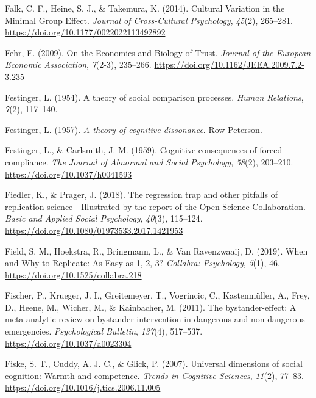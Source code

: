 \documentclass[
  letterpaper,
]{book}
\newlength{\cslhangindent}
\newenvironment{CSLReferences}[2] %
 {\begin{list}{}{%
  \setlength{\itemindent}{0pt}
  \setlength{\leftmargin}{0pt}
  \setlength{\parsep}{0pt}
  \ifodd #1
   \setlength{\leftmargin}{\cslhangindent}
   \setlength{\itemindent}{-1\cslhangindent}
  \fi
  \setlength{\itemsep}{#2\baselineskip}}}
 {\end{list}}
\begin{document}
\begin{CSLReferences}{1}{0}
Falk, C. F., Heine, S. J., \& Takemura, K. (2014). Cultural {Variation}
in the {Minimal} {Group} {Effect}. \emph{Journal of Cross-Cultural
Psychology}, \emph{45}(2), 265--281.
\url{https://doi.org/10.1177/0022022113492892}

Fehr, E. (2009). On the {Economics} and {Biology} of {Trust}.
\emph{Journal of the European Economic Association}, \emph{7}(2-3),
235--266. \url{https://doi.org/10.1162/JEEA.2009.7.2-3.235}

Festinger, L. (1954). A theory of social comparison processes.
\emph{Human Relations}, \emph{7}(2), 117--140.

Festinger, L. (1957). \emph{A theory of cognitive dissonance}. Row
Peterson.

Festinger, L., \& Carlsmith, J. M. (1959). Cognitive consequences of
forced compliance. \emph{The Journal of Abnormal and Social Psychology},
\emph{58}(2), 203--210. \url{https://doi.org/10.1037/h0041593}

Fiedler, K., \& Prager, J. (2018). The regression trap and other
pitfalls of replication science---{Illustrated} by the report of the
{Open} {Science} {Collaboration}. \emph{Basic and Applied Social
Psychology}, \emph{40}(3), 115--124.
\url{https://doi.org/10.1080/01973533.2017.1421953}

Field, S. M., Hoekstra, R., Bringmann, L., \& Van Ravenzwaaij, D.
(2019). When and {Why} to {Replicate}: {As} {Easy} as 1, 2, 3?
\emph{Collabra: Psychology}, \emph{5}(1), 46.
\url{https://doi.org/10.1525/collabra.218}

Fischer, P., Krueger, J. I., Greitemeyer, T., Vogrincic, C.,
Kastenmüller, A., Frey, D., Heene, M., Wicher, M., \& Kainbacher, M.
(2011). The bystander-effect: {A} meta-analytic review on bystander
intervention in dangerous and non-dangerous emergencies.
\emph{Psychological Bulletin}, \emph{137}(4), 517--537.
\url{https://doi.org/10.1037/a0023304}

Fiske, S. T., Cuddy, A. J. C., \& Glick, P. (2007). Universal dimensions
of social cognition: Warmth and competence. \emph{Trends in Cognitive
Sciences}, \emph{11}(2), 77--83.
\url{https://doi.org/10.1016/j.tics.2006.11.005}


\end{CSLReferences}
\end{document}
